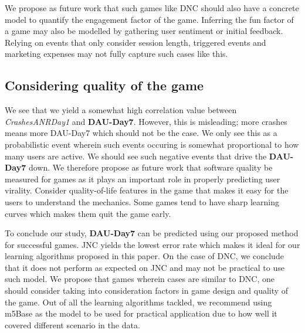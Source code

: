 We propose as future work that such games like DNC should also have a concrete model to quantify the engagement factor of the game. Inferring the fun factor of a game may also be modelled by gathering user sentiment or initial feedback. Relying on events that only consider session length, triggered events and marketing expenses may not fully capture such cases like this.

\subsection{Considering quality of the game}
We see that we yield a somewhat high correlation value between \textit{CrashesANRDay1} and \textbf{DAU-Day7}. However, this is misleading; more crashes means more DAU-Day7 which should not be the case. We only see this as a probabilistic event wherein such events occuring is somewhat proportional to how many users are active. We should see such negative events that drive the \textbf{DAU-Day7} down. We therefore propose as future work that software quality be measured for games as it plays an important role in properly predicting user virality. Consider quality-of-life features in the game that makes it easy for the users to understand the mechanics. Some games tend to have sharp learning curves which makes them quit the game early.

To conclude our study, \textbf{DAU-Day7} can be predicted using our proposed method for successful games. JNC yields the lowest error rate which makes it ideal for our learning algorithms proposed in this paper. On the case of DNC, we conclude that it does not perform as expected on JNC and may not be practical to use such model. We propose that games wherein cases are similar to DNC, one should consider taking into consideration factors in game design and quality of the game. Out of all the learning algorithms tackled, we recommend using m5Base as the model to be used for practical application due to how well it covered different scenario in the data.